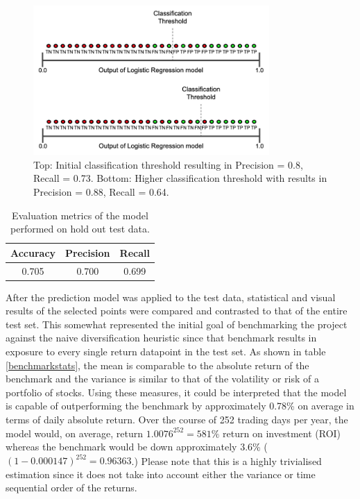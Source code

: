 \documentclass[10pt,onecolumn,letterpaper]{article}
\begin{document}
\begin{figure}[!hbt!]
\centering
\includegraphics[width=9cm]{classification_threshold.png}
\caption{Top: Initial classification threshold resulting in Precision = 0.8, Recall = 0.73. Bottom: Higher classification threshold with results in Precision = 0.88, Recall = 0.64.}
\label{classification_threshold}
\end{figure} 

\begin{table}[hbt!]
\begin{center}
\begin{tabular}{c|c|c}
Accuracy & Precision & Recall\\
\hline
0.705 & 0.700 & 0.699\\
\end{tabular}
\end{center}
\caption{Evaluation metrics of the model performed on hold out test data.}
\label{eval_metrics}
\end{table}

After the prediction model was applied to the test data, statistical and visual results of the selected points were compared and contrasted to that of the entire test set. This somewhat represented the initial goal of benchmarking the project against the naive diversification heuristic since that benchmark results in exposure to every single return datapoint in the test set. As shown in table \ref{benchmarkstats}, the mean is comparable to the absolute return of the benchmark and the variance is similar to that of the volatility or risk of a portfolio of stocks. Using these measures, it could be interpreted that the model is capable of outperforming the benchmark by approximately 0.78\% on average in terms of daily absolute return. Over the course of 252 trading days per year, the model would, on average, return $1.0076^{252} = 581\%$ return on investment (ROI) whereas the benchmark would be down approximately 3.6\% ($(1-0.000147)^{252} = 0.96363$.) Please note that this is a highly trivialised estimation since it does not take into account either the variance or time sequential order of the returns.
\end{document}
